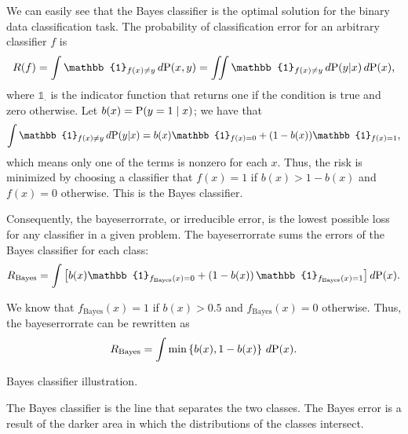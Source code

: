 We can easily see that the Bayes \gls{classifier} is the optimal solution for the binary data
classification task.  The probability of classification error for an arbitrary \gls{classifier}
$f$ is
\begin{equation*}
  R(f) = \int \mathbb{1}_{f(x) \neq y}\, d\!\Prob(x, y) =
    \iint \mathbb{1}_{f(x) \neq y}\, d\!\Prob(y | x)\, d\!\Prob(x)\text{,}
\end{equation*}
where $\mathbb{1}_{\cdot}$ is the indicator function that returns one if the condition is
true and zero otherwise.  Let $b(x) = \operatorname{P}(y = 1 \mid x)$; we have that
\[
  \int \mathbb{1}_{f(x) \neq y}\, d\!\Prob(y | x) =
    b(x) \mathbb{1}_{f(x) = 0} + (1 - b(x)) \mathbb{1}_{f(x) = 1}\text{,}
\]
which means only one of the terms is nonzero for each $x$.  Thus, the risk is minimized by choosing
a \gls{classifier} that $f(x) = 1$ if $b(x) > 1 - b(x)$ and $f(x) = 0$ otherwise.  This is the
Bayes \gls{classifier}.

Consequently, the \gls{bayeserrorrate}, or irreducible error, is the lowest possible \gls{loss} for any
\gls{classifier} in a given problem.  The \gls{bayeserrorrate} sums the errors of the
Bayes \gls{classifier} for each class:
\begin{equation*}
  R_\text{Bayes} = \int \left[
    b(x) \mathbb{1}_{f_\text{Bayes}(x) = 0} +
    \left(1 - b(x)\right) \mathbb{1}_{f_\text{Bayes}(x) = 1}
  \right] d\!\Prob(x)\text{.}
\end{equation*}

We know that $f_\text{Bayes}(x) = 1$ if $b(x) > 0.5$ and $f_\text{Bayes}(x) = 0$ otherwise.
Thus, the \gls{bayeserrorrate} can be rewritten as
\begin{equation*}
  R_\text{Bayes} = \int \min\left\{ b(x), 1 - b(x) \right\}\, d\!\operatorname{P}(x)\text{.}
\end{equation*}

\begin{figurebox}[label=fig:bayes-classifier]{Bayes \gls{classifier} illustration.}
  \centering
  \tcblower
  The Bayes \gls{classifier} is the line that separates the two classes.  The Bayes error is a
  result of the darker area in which the distributions of the classes intersect.
\end{figurebox}


